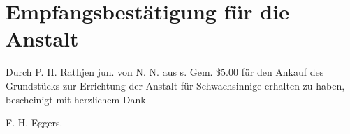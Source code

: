 \chapter{Empfangsbestätigung für die Anstalt}

Durch P. H. Rathjen jun. von N. N. aus s. Gem. \$5.00 für den Ankauf des Grundstücks zur Errichtung der Anstalt für Schwachsinnige erhalten zu haben, bescheinigt mit herzlichem Dank

F. H. Eggers.
